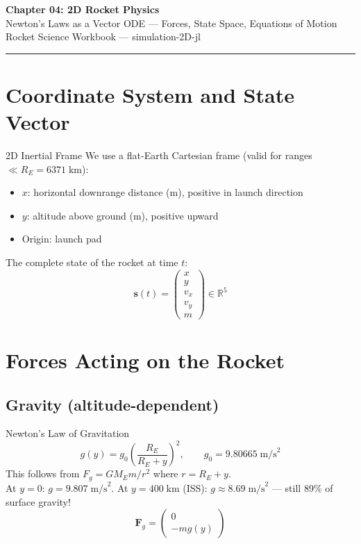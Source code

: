 \documentclass[12pt, a4paper]{article}
\begin{document}
\begin{center}
  {\LARGE \textbf{Chapter 04: 2D Rocket Physics}}\\[0.5em]
  {\large \textcolor{hintgray}{Newton's Laws as a Vector ODE — Forces, State Space, Equations of Motion}}\\[0.3em]
  {\small \textcolor{hintgray}{Rocket Science Workbook — simulation-2D-jl}}
\end{center}
\vspace{1em}\hrule\vspace{1.5em}

\section{Coordinate System and State Vector}

\begin{theorybox}{2D Inertial Frame}
We use a flat-Earth Cartesian frame (valid for ranges $\ll R_E = 6371\;\text{km}$):
\begin{itemize}
  \item $x$: horizontal downrange distance (m), positive in launch direction
  \item $y$: altitude above ground (m), positive upward
  \item Origin: launch pad
\end{itemize}
The complete state of the rocket at time $t$:
\[
  \mathbf{s}(t) = \begin{pmatrix} x \\ y \\ v_x \\ v_y \\ m \end{pmatrix}
  \in \mathbb{R}^5
\]
\end{theorybox}

\section{Forces Acting on the Rocket}

\subsection*{Gravity (altitude-dependent)}

\begin{theorybox}{Newton's Law of Gravitation}
\[
  g(y) = g_0\left(\frac{R_E}{R_E + y}\right)^2, \qquad g_0 = 9.80665\;\text{m/s}^2
\]
This follows from $F_g = G M_E m / r^2$ where $r = R_E + y$.\\
At $y = 0$: $g = 9.807\;\text{m/s}^2$. \;
At $y = 400\;\text{km}$ (ISS): $g \approx 8.69\;\text{m/s}^2$ — still 89\% of surface gravity!
\[
  \mathbf{F}_g = \begin{pmatrix} 0 \\ -mg(y) \end{pmatrix}
\]
\end{theorybox}
\end{document}
